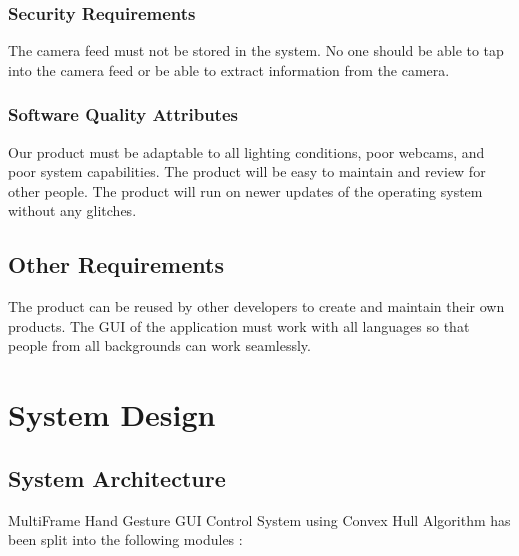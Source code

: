 \documentclass[11pt]{report}
\begin{document}
\subsection{Security Requirements}
The camera feed must not be stored in the system. No one should be able to tap into the camera feed or be able to extract information from the camera.

\subsection{Software Quality Attributes}

Our product must be adaptable to all lighting conditions, poor webcams, and poor system capabilities. The product will be easy to maintain and review for other people. The  product will run on newer updates of the operating system without any glitches.

\section{Other Requirements}
The product can be reused by other developers to create and maintain their own products. The GUI of the application must work with all languages so that people from all backgrounds can work seamlessly. 




\chapter{System Design}
\section{System Architecture}


MultiFrame Hand Gesture GUI Control System using Convex Hull Algorithm has been split into the following modules :
\newline
\newline
{}
\end{document}
